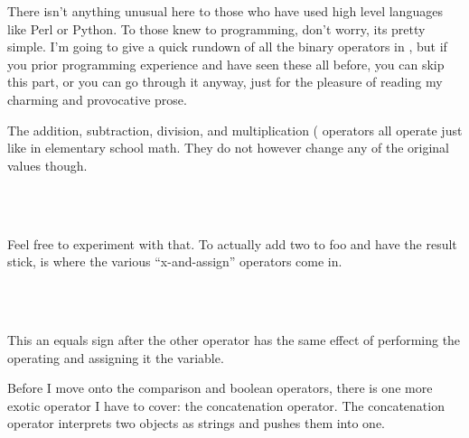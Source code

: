 There isn't anything unusual here to those who have used high level languages like Perl or Python.  To those knew to programming, don't worry, its pretty simple.  I'm going to give a quick rundown of all the binary operators in \SSquared{}, but if you prior programming experience and have seen these all before, you can skip this part, or you can go through it anyway, just for the pleasure of reading my charming and provocative prose.

The addition, subtraction, division, and multiplication (\SSCode{+, -, /, $*$} operators all operate just like in elementary school math.  They do not however change any of the original values though.

\begin{SSCodeBox}
\scitea{;} \\
\scitea{; }
\scitea{} \\
\end{SSCodeBox}

Feel free to experiment with that.  To actually add two to foo and have the result stick, is where the various ``x-and-assign'' operators come in.

\begin{SSCodeBox}
\scitea{;} \\
\scitea{; }
\scitea{} \\
\end{SSCodeBox}

This an equals sign after the other operator has the same effect of performing the operating and assigning it the variable.  

Before I move onto the comparison and boolean operators, there is one more exotic operator I have to cover: the concatenation operator.  The concatenation operator interprets two objects as strings and pushes them into one.

\begin{SSCodeBox}
\scitea{ }
\scitea{ + }
\scitea{ + }
\scitea{;} \\
\scitea{} \\
\scitea{} \\
\scitea{ }
\scitea{;} \\
\end{SSCodeBox}

